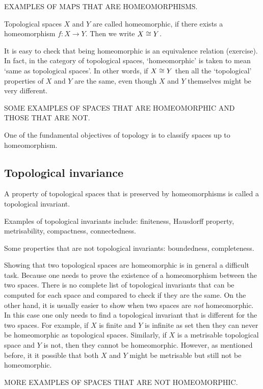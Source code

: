 EXAMPLES OF MAPS THAT ARE HOMEOMORPHISMS.

\begin{ndfn}
  Topological spaces $X$ and $Y$ are called homeomorphic, if there exists a homeomorphism $f: X \to Y$. Then we write $X \cong Y$.
\end{ndfn}

It is easy to check that being homeomorphic is an equivalence relation (exercise). In fact, in the category of topological spaces, `homeomorphic' is taken to mean `same as topological spaces'. In other words, if $X \cong Y$ then all the `topological' properties of $X$ and $Y$ are the same, even though $X$ and $Y$ themselves might be very different.

SOME EXAMPLES OF SPACES THAT ARE HOMEOMORPHIC AND THOSE THAT ARE NOT.

One of the fundamental objectives of topology is to classify spaces up to homeomorphism.

\subsection{Topological invariance}
\begin{ndfn}
  A property of topological spaces that is preserved by homeomorphisms is called a topological invariant.
\end{ndfn}

Examples of topological invariants include: finiteness, Hausdorff property, metrisability, compactness, connectedness.

Some properties that are not topological invariants: boundedness, completeness.

Showing that two topological spaces are homeomorphic is in general a difficult task. Because one needs to prove the existence of a homeomorphism between the two spaces. There is no complete list of topological invariants that can be computed for each space and compared to check if they are the same. On the other hand, it is usually easier to show when two spaces are \emph{not} homeomorphic. In this case one only needs to find a topological invariant that is different for the two spaces. For example, if $X$ is finite and $Y$ is infinite as set then they can never be homeomorphic as topological spaces. Similarly, if $X$ is a metrisable topological space and $Y$ is not, then they cannot be homeomorphic. However, as mentioned before, it it possible that both $X$ and $Y$ might be metrisable but still not be homeomorphic.

MORE EXAMPLES OF SPACES THAT ARE NOT HOMEOMORPHIC.